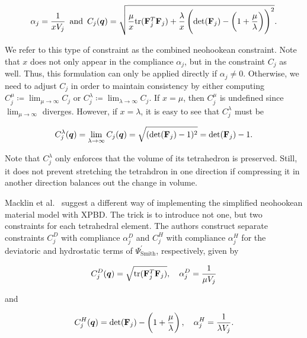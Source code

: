 \[
    \alpha_j = \frac{1}{x V_j} \, \, \, \text{and} \, \, \, C_j(\bm{q}) = \sqrt{\frac{\mu}{x}\text{tr}(\mathbf{F}_j^T\mathbf{F}_j)     
    + \frac{\lambda}{x}\left(\text{det}(\mathbf{F}_j) - \left(1 + \frac{\mu}{\lambda}\right)\right)^2}.
\]

\noindent We refer to this type of constraint as the combined neohookean constraint. Note that $x$ does not only appear in the 
compliance $\alpha_j$, but in the constraint $C_j$ as well. Thus, this formulation can only be applied directly if $\alpha_j \neq 0$. 
Otherwise, we need to adjust $C_j$ in order to maintain consistency by either computing $C^\mu_j \coloneqq \lim_{\mu\to\infty}C_j$ 
or $C^\lambda_j \coloneqq \lim_{\lambda\to\infty}C_j$. If $x = \mu$, then $C^\mu_j$ is undefined since $\lim_{\mu\to\infty}$ diverges. 
However, if $x = \lambda$, it is easy to see that $C^\lambda_j$ must be

\begin{equation}\label{eq:combined-neohookean-0-compliance}
    C^\lambda_j(\bm{q}) = \lim_{\lambda\to\infty}  C_j(\bm{q}) = \sqrt{(\text{det}(\mathbf{F}_j) - 1)^2} = \text{det}(\mathbf{F}_j) - 1.
\end{equation}
    

\noindent Note that $C^\lambda_j$ only enforces that the volume of its tetrahedron is preserved. Still, it does not prevent stretching the 
tetrahdron in one direction if compressing it in another direction balances out the change in volume. 

Macklin et al.\ \cite{macklin2021} suggest a different way of implementing the simplified neohookean material model with XPBD. The trick is 
to introduce not one, but two constraints for each tetrahedral element. The authors construct separate constraints $C^D_j$ with compliance 
$\alpha^D_j$ and $C^H_j$ with compliance $\alpha^H_j$ for the deviatoric and hydrostatic terms of $\Psi^\prime_{\text{Smith}}$, respectively, 
given by 

\begin{equation}\label{eq:deviatoric-constraint}
    C^D_j(\bm{q}) = \sqrt{\text{tr}(\mathbf{F}_j^T\mathbf{F}_j)}, \, \, \, \, \, \, \alpha^D_j = \frac{1}{\mu V_j}
\end{equation}

\noindent and 

\begin{equation}\label{eq:hydrostatic-constraint}
    C^H_j(\bm{q}) = \text{det}(\mathbf{F}_j) - \left(1 + \frac{\mu}{\lambda}\right), \, \, \, \, \, \, \alpha^H_j = \frac{1}{\lambda V_j}.
\end{equation}

